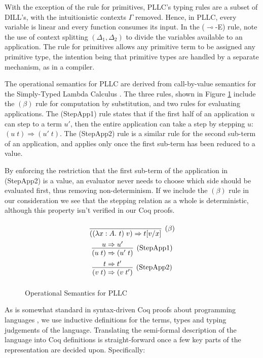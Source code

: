 \documentclass[]{unswthesis}
\newcommand{\lam}[1]{\lambda #1 \ldotp \,}
\newcommand{\app}[2]{(#1 \; #2)}
\newcommand{\lolly}{\multimap}
\newcommand{\steps}{\Rightarrow}
\let\t\text
\begin{document}
With the exception of the rule for primitives, PLLC's typing rules are a subset of DILL's, with the intuitionistic contexts $\Gamma$ removed. Hence, in PLLC, every variable is linear and every function consumes its input. In the ($\lolly$-E) rule, note the use of context splitting $(\Delta_1, \Delta_2)$ to divide the variables available to an application. The rule for primitives allows any primitive term to be assigned any primitive type, the intention being that primitive types are handled by a separate mechanism, as in a compiler.

The operational semantics for PLLC are derived from call-by-value semantics for the Simply-Typed Lambda Calculus \cite{pierce15}. The three rules, shown in Figure \ref{pllc-op-sems} include the $(\beta)$ rule for computation by substitution, and two rules for evaluating applications. The (StepApp1) rule states that if the first half of an application $u$ can step to a term $u'$, then the entire application can take a step by stepping $u$: $\app{u}{t} \steps \app{u'}{t}$. The (StepApp2) rule is a similar rule for the second sub-term of an application, and applies only once the first sub-term has been reduced to a value.

By enforcing the restriction that the first sub-term of the application in (StepApp2) is a value, an evaluator never needs to choose which side should be evaluated first, thus removing non-determinism. If we include the $(\beta)$ rule in our consideration we see that the stepping relation as a whole is deterministic, although this property isn't verified in our Coq proofs.

\begin{figure}[h]
\caption{Operational Semantics for PLLC}
\label{pllc-op-sems}
\begin{displaymath}
\arraycolsep=1.4pt\def\arraystretch{2.2}
\begin{array}{cc}
\infer[(\beta)]{\app{(\lam{x : A} t)}{v} \steps t[v / x]}{} \\
\infer[\t{(StepApp1)}]{\app{u}{t} \steps \app{u'}{t}}{u \steps u'} \\
\infer[\t{(StepApp2)}]{\app{v}{t} \steps \app{v}{t'}}{t \steps t'} \\
\end{array}
\end{displaymath}
\end{figure}

As is somewhat standard in syntax-driven Coq proofs about programming languages \cite{pierce15}, we use inductive definitions for the terms, types and typing judgements of the language. Translating the semi-formal description of the language into Coq definitions is straight-forward once a few key parts of the representation are decided upon. Specifically:
\end{document}
